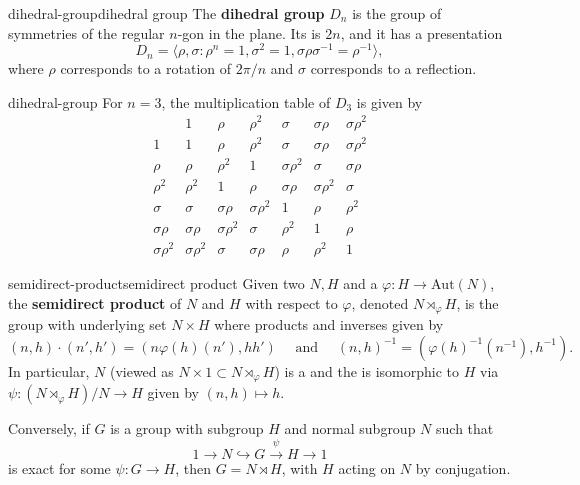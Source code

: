 \begin{topic}{dihedral-group}{dihedral group}
    The \textbf{dihedral group} $D_n$ is the group of symmetries of the regular $n$-gon in the plane. Its  is $2n$, and it has a presentation
    \[ D_n = \langle \rho, \sigma : \rho^n = 1, \sigma^2 = 1, \sigma \rho \sigma^{-1} = \rho^{-1} \rangle , \]
    where $\rho$ corresponds to a rotation of $2 \pi / n$ and $\sigma$ corresponds to a reflection.
\end{topic}

\begin{example}{dihedral-group}
    For $n = 3$, the multiplication table of $D_3$ is given by
    \[ \begin{array}{c||c|c|c|c|c|c} 
           & 1 & \rho & \rho^2 & \sigma & \sigma \rho & \sigma \rho^2 \\ \hline \hline
         1 & 1 & \rho & \rho^2 & \sigma & \sigma \rho & \sigma \rho^2 \\ \hline
         \rho & \rho & \rho^2 & 1 & \sigma \rho^2 & \sigma & \sigma \rho \\ \hline
         \rho^2 & \rho^2 & 1 & \rho & \sigma \rho & \sigma \rho^2 & \sigma \\ \hline
         \sigma & \sigma & \sigma \rho & \sigma \rho^2 & 1 & \rho & \rho^2 \\ \hline
         \sigma \rho & \sigma \rho & \sigma \rho^2 & \sigma & \rho^2 & 1 & \rho \\ \hline
         \sigma \rho^2 & \sigma \rho^2 & \sigma & \sigma \rho & \rho & \rho^2 & 1
    \end{array} \]
\end{example}

\begin{topic}{semidirect-product}{semidirect product}
    Given two  $N, H$ and a  $\varphi : H \to \text{Aut}(N)$, the \textbf{semidirect product} of $N$ and $H$ with respect to $\varphi$, denoted $N \rtimes_\varphi H$, is the group with underlying set $N \times H$ where products and inverses given by
    \[ (n, h) \cdot (n', h') = (n \varphi(h)(n'), h h') \quad \text{ and } \quad (n, h)^{-1} = (\varphi(h)^{-1}(n^{-1}), h^{-1}) . \]
    In particular, $N$ (viewed as $N \times 1 \subset N \rtimes_\varphi H$) is a  and the  is isomorphic to $H$ via $\psi : (N \rtimes_\varphi H)/N \to H$ given by $(n, h) \mapsto h$.
    
    Conversely, if $G$ is a group with subgroup $H$ and normal subgroup $N$ such that
    \[ 1 \to N \hookrightarrow G \xrightarrow{\psi} H \to 1 \]
    is exact for some $\psi : G \to H$, then $G = N \rtimes H$, with $H$ acting on $N$ by conjugation.
\end{topic}

